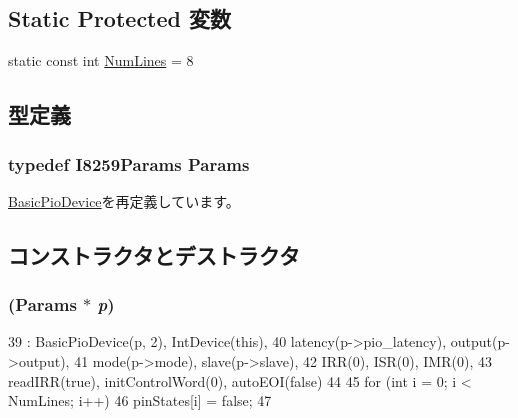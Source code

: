 \subsection*{Static Protected 変数}
\begin{DoxyCompactItemize}
\item 
static const int \hyperlink{classX86ISA_1_1I8259_a394ed08d7eedb814e519387710d14243}{NumLines} = 8
\end{DoxyCompactItemize}


\subsection{型定義}
\hypertarget{classX86ISA_1_1I8259_a370f3ee3a425cd3262c46d09b80327fe}{
\subsubsection[{Params}]{\setlength{\rightskip}{0pt plus 5cm}typedef I8259Params {\bf Params}}}
\label{classX86ISA_1_1I8259_a370f3ee3a425cd3262c46d09b80327fe}


\hyperlink{classBasicPioDevice_a2845515ac6467f10540747053c8a0449}{BasicPioDevice}を再定義しています。

\subsection{コンストラクタとデストラクタ}
\hypertarget{classX86ISA_1_1I8259_aa1c12bc35b1690e4820a82dedc82a062}{
\subsubsection[{I8259}]{ ({\bf Params} $\ast$ {\em p})}}
\label{classX86ISA_1_1I8259_aa1c12bc35b1690e4820a82dedc82a062}



\begin{DoxyCode}
39     : BasicPioDevice(p, 2), IntDevice(this),
40       latency(p->pio_latency), output(p->output),
41       mode(p->mode), slave(p->slave),
42       IRR(0), ISR(0), IMR(0),
43       readIRR(true), initControlWord(0), autoEOI(false)
44 {
45     for (int i = 0; i < NumLines; i++)
46         pinStates[i] = false;
47 }
\end{DoxyCode}


